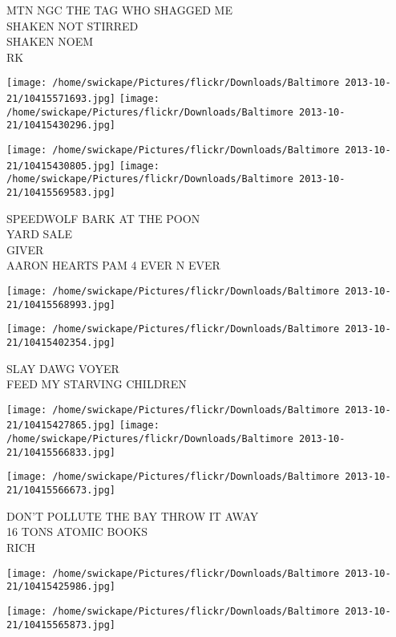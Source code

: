 \documentclass[10pt,letterpaper]{article}
\begin{document}
MTN NGC THE TAG WHO SHAGGED ME\\
SHAKEN NOT STIRRED\\
SHAKEN NOEM\\
RK\\
\pagebreak

\texttt{[image: /home/swickape/Pictures/flickr/Downloads/Baltimore 2013-10-21/10415571693.jpg]}
\texttt{[image: /home/swickape/Pictures/flickr/Downloads/Baltimore 2013-10-21/10415430296.jpg]}

\texttt{[image: /home/swickape/Pictures/flickr/Downloads/Baltimore 2013-10-21/10415430805.jpg]}
\texttt{[image: /home/swickape/Pictures/flickr/Downloads/Baltimore 2013-10-21/10415569583.jpg]}

SPEEDWOLF BARK AT THE POON\\
YARD SALE\\
GIVER\\
AARON HEARTS PAM 4 EVER N EVER\\
\pagebreak

\texttt{[image: /home/swickape/Pictures/flickr/Downloads/Baltimore 2013-10-21/10415568993.jpg]}

\vspace{0.25in}
\texttt{[image: /home/swickape/Pictures/flickr/Downloads/Baltimore 2013-10-21/10415402354.jpg]}

SLAY DAWG VOYER\\
FEED MY STARVING CHILDREN\\
\pagebreak

\texttt{[image: /home/swickape/Pictures/flickr/Downloads/Baltimore 2013-10-21/10415427865.jpg]}
\texttt{[image: /home/swickape/Pictures/flickr/Downloads/Baltimore 2013-10-21/10415566833.jpg]}

\vspace{0.25in}
\texttt{[image: /home/swickape/Pictures/flickr/Downloads/Baltimore 2013-10-21/10415566673.jpg]}

DON'T POLLUTE THE BAY THROW IT AWAY\\
16 TONS ATOMIC BOOKS\\
RICH\\
\pagebreak

\texttt{[image: /home/swickape/Pictures/flickr/Downloads/Baltimore 2013-10-21/10415425986.jpg]}

\vspace{0.25in}
\texttt{[image: /home/swickape/Pictures/flickr/Downloads/Baltimore 2013-10-21/10415565873.jpg]}
\end{document}
